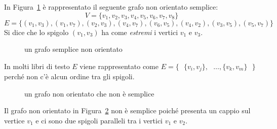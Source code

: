 \begin{ese}
In Figura~\ref{fig:grf_semplice} è rappresentato il seguente grafo non orientato semplice:
\[V = \{ v_1, v_2, v_3, v_4, v_5, v_6, v_7, v_8 \}\]
\[E = \{ (v_1,v_3), (v_1,v_7), (v_2,v_3), (v_4,v_7),(v_6,v_5), (v_4,v_2), (v_3,v_5), (v_5,v_7) \}\]
Si dice che lo spigolo $(v_1,v_3)$ ha come \emph{estremi} i vertici $v_1$ e $v_3$. \QEDA
\end{ese}
\begin{figure}[H]
    \centering
    \caption{un grafo semplice non orientato}
    \label{fig:grf_semplice}
\end{figure}
In molti libri di testo 
$E$ viene rappresentato come ${E = \{ \text{ } \{v_i,v_j\}, \text{ } \dots, \{v_k,v_m\} \text{ } \}}$ perché non c'è
alcun ordine tra gli spigoli.
\begin{ese}
    \begin{figure}[H]
        \centering
        \caption{un grafo non orientato che non è semplice} \label{fig:no_semplice}
    \end{figure}
Il grafo non orientato in Figura~\ref{fig:no_semplice} non è semplice poiché presenta un
cappio sul vertice $v_1$ e ci sono due spigoli paralleli tra i vertici $v_1$ e $v_2$.
\QEDA
\end{ese}

